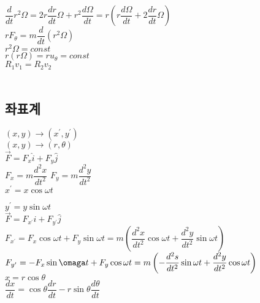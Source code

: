 \documentclass[a4paper]{article}
\begin{document}
$\dfrac{d}{dt} r^{2}\Omega = 2 r \dfrac{dr}{dt} \Omega + r^{2} \dfrac{d\Omega}{dt} 
= r \left( r \dfrac{d\Omega}{dt} +2 \dfrac{dr}{dt} \Omega \right) $\\

$ r F_{\theta} = m \dfrac{d}{dt} \left(r^{2} \Omega \right) $\\

$ r^{2} \Omega = const$\\

$ r \left( r \Omega \right) = r u_{\theta} = const $ \\


$ R_{1} v_{1} = R_{2} v_{2}$\\
\\

\subsection{좌표계}

$ (x, y) 	\rightarrow (x^{\prime}, y^{\prime})$\\

$ (x, y) 	\rightarrow (r, \theta)$\\

$ \overrightarrow {F} = F_{x} \hat{i}  + F_{y} \hat{j} $\\

$ F_{x} = m \dfrac{d^{2}x}{dt^{2}}$
$ F_{y} = m \dfrac{d^{2}y}{dt^{2}}$\\

$ x^{\prime} = x \cos \omega t$

$ y^{\prime} = y \sin \omega t$\\

$ \overrightarrow {F} = F_{x^{\prime}} \hat{i}  + F_{y^{\prime}} \hat{j} $\\

$ F_{x^{\prime}} = F_{x} \cos \omega t + F_{y} \sin \omega t
= m \left ( \dfrac{d^{2}x}{dt^{2}} \cos \omega t + \dfrac{d^{2}y}{dt^{2}} \sin \omega t \right) $\\

$ F_{y^{\prime}} = -F_{x} \sin \omaga t + F_{y} \cos \omega t
= m \left ( - \dfrac{d^{2}s}{dt^{2}} \sin \omega t + \dfrac{d^{2}y}{dt^{2}} \cos \omega t \right) $\\


$ x = r \cos \theta $ \\

$\dfrac{dx}{dt} = \cos \theta \dfrac{dr}{dt} - r \sin \theta \dfrac{d\theta}{dt}$ \\
\end{document}
